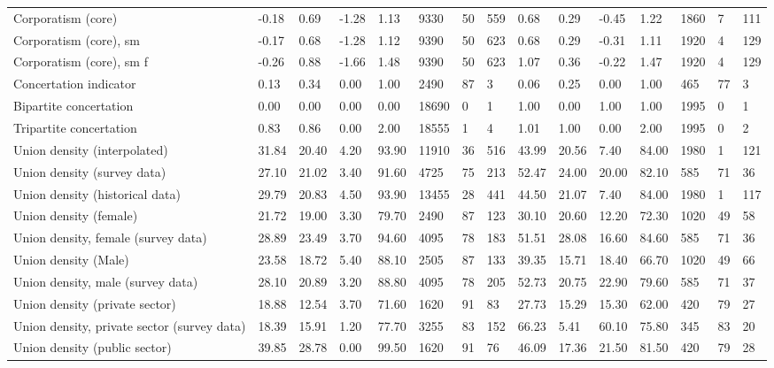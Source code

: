 \begin{longtable}{lllllllllllllll}
Corporatism (core) & -0.18 & 0.69 & -1.28 & 1.13 & 9330 & 50 & 559 & 0.68 & 0.29 & -0.45 & 1.22 & 1860 & 7 & 111\\
\addlinespace
Corporatism (core), sm & -0.17 & 0.68 & -1.28 & 1.12 & 9390 & 50 & 623 & 0.68 & 0.29 & -0.31 & 1.11 & 1920 & 4 & 129\\
Corporatism (core), sm f & -0.26 & 0.88 & -1.66 & 1.48 & 9390 & 50 & 623 & 1.07 & 0.36 & -0.22 & 1.47 & 1920 & 4 & 129\\
Concertation indicator & 0.13 & 0.34 & 0.00 & 1.00 & 2490 & 87 & 3 & 0.06 & 0.25 & 0.00 & 1.00 & 465 & 77 & 3\\
Bipartite concertation & 0.00 & 0.00 & 0.00 & 0.00 & 18690 & 0 & 1 & 1.00 & 0.00 & 1.00 & 1.00 & 1995 & 0 & 1\\
Tripartite concertation & 0.83 & 0.86 & 0.00 & 2.00 & 18555 & 1 & 4 & 1.01 & 1.00 & 0.00 & 2.00 & 1995 & 0 & 2\\
\addlinespace
Union density (interpolated) & 31.84 & 20.40 & 4.20 & 93.90 & 11910 & 36 & 516 & 43.99 & 20.56 & 7.40 & 84.00 & 1980 & 1 & 121\\
Union density (survey data) & 27.10 & 21.02 & 3.40 & 91.60 & 4725 & 75 & 213 & 52.47 & 24.00 & 20.00 & 82.10 & 585 & 71 & 36\\
Union density (historical data) & 29.79 & 20.83 & 4.50 & 93.90 & 13455 & 28 & 441 & 44.50 & 21.07 & 7.40 & 84.00 & 1980 & 1 & 117\\
Union density (female) & 21.72 & 19.00 & 3.30 & 79.70 & 2490 & 87 & 123 & 30.10 & 20.60 & 12.20 & 72.30 & 1020 & 49 & 58\\
Union density, female (survey data) & 28.89 & 23.49 & 3.70 & 94.60 & 4095 & 78 & 183 & 51.51 & 28.08 & 16.60 & 84.60 & 585 & 71 & 36\\
\addlinespace
Union density (Male) & 23.58 & 18.72 & 5.40 & 88.10 & 2505 & 87 & 133 & 39.35 & 15.71 & 18.40 & 66.70 & 1020 & 49 & 66\\
Union density, male (survey data) & 28.10 & 20.89 & 3.20 & 88.80 & 4095 & 78 & 205 & 52.73 & 20.75 & 22.90 & 79.60 & 585 & 71 & 37\\
Union density (private sector) & 18.88 & 12.54 & 3.70 & 71.60 & 1620 & 91 & 83 & 27.73 & 15.29 & 15.30 & 62.00 & 420 & 79 & 27\\
Union density, private sector (survey data) & 18.39 & 15.91 & 1.20 & 77.70 & 3255 & 83 & 152 & 66.23 & 5.41 & 60.10 & 75.80 & 345 & 83 & 20\\
Union density (public sector) & 39.85 & 28.78 & 0.00 & 99.50 & 1620 & 91 & 76 & 46.09 & 17.36 & 21.50 & 81.50 & 420 & 79 & 28\\

\end{longtable}
